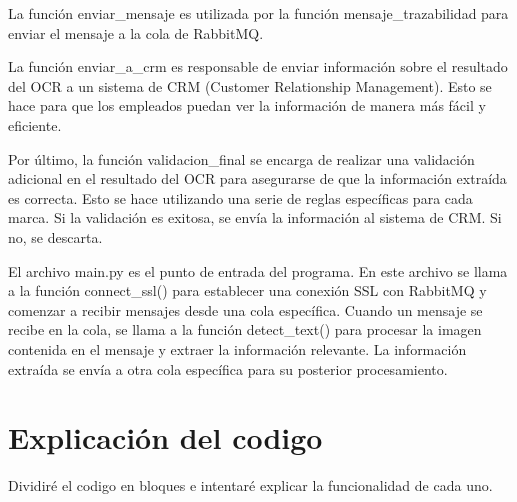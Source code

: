 \documentclass{article}
\begin{document}
La función enviar\_mensaje es utilizada por la función mensaje\_trazabilidad para enviar el mensaje a la cola de RabbitMQ.

La función enviar\_a\_crm es responsable de enviar información sobre el resultado del OCR a un sistema de CRM (Customer Relationship Management). Esto se hace para que los empleados puedan ver la información de manera más fácil y eficiente.

Por último, la función validacion\_final se encarga de realizar una validación adicional en el resultado del OCR para asegurarse de que la información extraída es correcta. Esto se hace utilizando una serie de reglas específicas para cada marca. Si la validación es exitosa, se envía la información al sistema de CRM. Si no, se descarta.

El archivo main.py es el punto de entrada del programa. En este archivo se llama a la función connect\_ssl() para establecer una conexión SSL con RabbitMQ y comenzar a recibir mensajes desde una cola específica. Cuando un mensaje se recibe en la cola, se llama a la función detect\_text() para procesar la imagen contenida en el mensaje y extraer la información relevante. La información extraída se envía a otra cola específica para su posterior procesamiento.

\newpage
\section{Explicación del codigo}
Dividiré el codigo en bloques e intentaré explicar la funcionalidad de cada uno.
\end{document}
